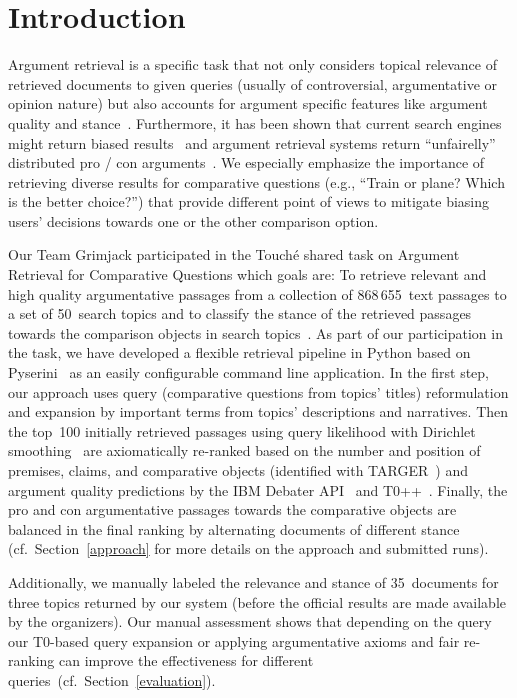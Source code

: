 \section{Introduction}\label{intro}

Argument retrieval is a specific task that not only considers topical relevance of retrieved documents to given queries (usually of controversial, argumentative or opinion nature) but also accounts for argument specific features like argument quality and stance~\cite{BondarenkoFBGAPBSWPH2020, BondarenkoGFBAPBSWPH2021}.  
Furthermore, it has been shown that current search engines might return biased results~\cite{ShahB2022} and argument retrieval systems return ``unfairelly'' distributed pro / con arguments~\cite{CherumanalSSC2021}.
We especially emphasize the importance of retrieving diverse results for comparative questions (e.g., ``Train or plane? Which is the better choice?'') that provide different point of views to mitigate biasing users' decisions towards one or the other comparison option.

Our Team Grimjack participated in the Touch{\'e} shared task on Argument Retrieval for Comparative Questions which goals are: \Ni To retrieve relevant and high quality argumentative passages from a collection of 868\,655~text passages to a set of 50~search topics and \Nii to classify the stance of the retrieved passages towards the comparison objects in search topics~\cite{BondarenkoFKSGBPBSWPH2022}.
As part of our participation in the task, we have developed a flexible retrieval pipeline in Python based on Pyserini~\cite{LinMLYPN2021} as an easily configurable command line application.
In the first step, our approach uses query (comparative questions from topics' titles) reformulation and expansion by important terms from topics' descriptions and narratives. Then the top~100 initially retrieved passages using query likelihood with Dirichlet smoothing~\cite{ZhaiL2001} are axiomatically re-ranked based on the number and position of premises, claims, and comparative objects (identified with TARGER~\cite{ChernodubOHBHBP2019}) and argument quality predictions by the IBM Debater API~\cite{ToledoGCFVLJAS2019} and T0++~\cite{SanhWRBSACSLRDBXTSSKCNDCJWMSYPBWNRSSFFTBGBWR2021}.
Finally, the pro and con argumentative passages towards the comparative objects are balanced in the final ranking by alternating documents of different stance (cf.\ Section~\ref{approach} for more details on the approach and submitted runs).

Additionally, we manually labeled the relevance and stance of 35~documents for three topics returned by our system (before the official results are made available by the organizers). Our manual assessment shows that depending on the query our T0-based query expansion or applying argumentative axioms and fair re-ranking can improve the effectiveness for different queries~(cf.\ Section~\ref{evaluation}).

